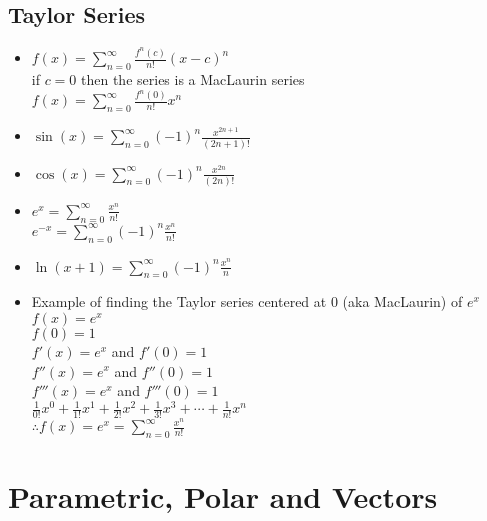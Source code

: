 \documentclass{article}
\begin{document}
  \subsection*{\color{BrickRed}Taylor Series}
  \begin{multicols}{2}
  \begin{itemize}
    \item \(
      f(x)=\sum\limits_{n=0}^{\infty}\frac{f^n(c)}{n!}(x-c)^n\)\\
      if \(c=0\) then the series is a MacLaurin series\\
      \subitem
      \(f(x)=\sum\limits_{n=0}^{\infty}\frac{f^n(0)}{n!}x^n\)\\
    \item  \(\sin(x)=\sum\limits_{n=0}^{\infty} (-1)^n
      \frac{x^{2n+1}}{(2n+1)!}\)\\
    \item \(\cos(x)=\sum\limits_{n=0}^{\infty}(-1)^n\frac{x^{2n}}{(2n)!}
     \)\\
    \item\( e^x=\sum\limits_{n=0}^{\infty}\frac{x^n}{n!} \)\\
      \subitem \( e^{-x}=\sum\limits_{n=0}^{\infty}(-1)^n
      \frac{x^n}{n!} \)\\
    \item \(\ln(x+1)=\sum\limits_{n=0}^{\infty}(-1)^n\frac{x^n}{n}\)\\
      \columnbreak
    \item Example of finding the Taylor series centered at 0 (aka
      MacLaurin) of \(e^x\)\\
      \subitem \(f(x)=e^x\)\\
      \subitem \(f(0)=1\)\\
      \(f'(x)=e^x\) and \(f'(0)=1\)\\
      \(f''(x)=e^x\) and \(f''(0)=1\)\\
      \(f'''(x)=e^x\) and \(f'''(0)=1\)\\
      \(\frac{1}{0!}x^0+\frac{1}{1!}x^1+\frac{1}{2!}x^2+\frac{1}{3!}x^3+\cdots+\frac{1}{n!}x^n\)\\
      \(\therefore f(x)=e^x=\sum\limits_{n=0}^{\infty}
      \frac{x^n}{n!}\)\\
  \end{itemize}
\end{multicols}
\newpage
\section*{\color{Gray}Parametric, Polar and Vectors}
\end{document}
